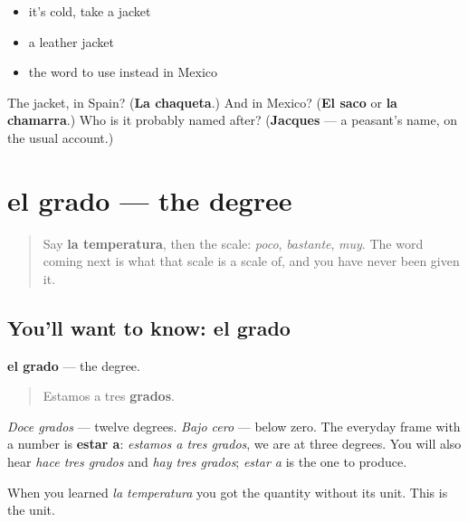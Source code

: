 \begin{itemize}
\raggedright
  \item it's cold, take a jacket
  \item a leather jacket
  \item the word to use instead in Mexico
\end{itemize}

\begin{tcolorbox}[breakable,colback=teal!4,colframe=teal!35!black,title={Before you move on}]
The jacket, in Spain? (\textbf{La chaqueta}.) And in Mexico? (\textbf{El saco} or \textbf{la chamarra}.) Who is it probably named after? (\textbf{Jacques} — a peasant's name, on the usual account.)
\end{tcolorbox}
\section[el grado]{el grado — the degree}

\label{lesson:ES-C468-grado}



\begin{quote}
Say \textbf{la temperatura}, then the scale: \emph{poco}, \emph{bastante}, \emph{muy}. The word coming next is what that scale is a scale of, and you have never been given it.
\end{quote}

\subsection*{You'll want to know: el grado}
\textbf{el grado} — the degree.

\begin{quote}
Estamos a tres \textbf{grados}.
\end{quote}

\emph{Doce grados} — twelve degrees. \emph{Bajo cero} — below zero. The everyday frame with a number is \textbf{estar a}: \emph{estamos a tres grados}, we are at three degrees. You will also hear \emph{hace tres grados} and \emph{hay tres grados}; \emph{estar a} is the one to produce.

When you learned \emph{la temperatura} you got the quantity without its unit. This is the unit.

